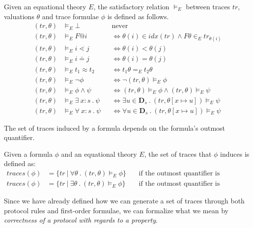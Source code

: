 \begin{definition}
    Given an equational theory $E$, the satisfactory relation $\vDash_E$ between traces $tr$, valuations $\theta$ and trace formulae $\phi$ is defined as follows.
    \begin{align*}
        (tr, \theta) &\vDash_E \bot && \text{never}\\
        (tr, \theta) &\vDash_E F @ i && \iff \theta(i) \in idx(tr) \land F\theta \in_E tr_{\theta(i)}\\
        (tr, \theta) &\vDash_E i \lessdot j && \iff \theta(i) < \theta(j)\\
        (tr, \theta) &\vDash_E i \doteq j && \iff \theta(i) = \theta(j)\\
        (tr, \theta) &\vDash_E t_1 \approx t_2 && \iff t_1\theta =_E t_2\theta \\
        (tr, \theta) &\vDash_E \neg \phi && \iff \neg (tr, \theta) \vDash_E \phi\\
        (tr, \theta) &\vDash_E \phi \land \psi && \iff (tr, \theta)\vDash_E \phi \land (tr, \theta) \vDash_E \psi \\
        (tr, \theta) &\vDash_E \exists \ x:s \ . \ \psi && \iff \exists u \in \mathbf{D}_s \ . \ (tr, \theta[x \mapsto u]) \vDash_E \psi \\
        (tr, \theta) &\vDash_E \forall \ x:s \ . \ \psi && \iff \forall u \in \mathbf{D}_s \ . \ (tr, \theta[x \mapsto u]) \vDash_E \psi
    \end{align*}
\end{definition}

The set of traces induced by a formula depends on the formula's outmost quantifier.

\begin{definition}
    Given a formula $\phi$ and an equational theory $E$, the set of traces that $\phi$ induces is defined as:
    \begin{align*}
        traces(\phi) &= \{tr \  | \ \forall \theta \ . \ (tr,\theta) \vDash_E \phi \} \ &&\text{if the outmost quantifier is universal}\\
        traces(\phi) &= \{tr \ | \ \exists \theta \ . \ (tr,\theta) \vDash_E \phi \} \ &&\text{if the outmost quantifier is existential}
    \end{align*}
\end{definition}

Since we have already defined how we can generate a set of traces through both protocol rules and first-order formulae, we can formalize what we mean by \textit{correctness of a protocol with regards to a property}.

